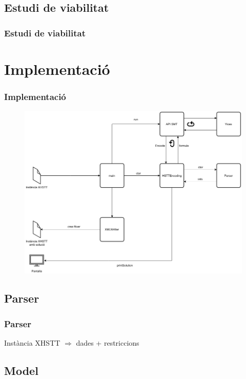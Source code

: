 \documentclass[8pt]{beamer}
\begin{document}
  \subsection{Estudi de viabilitat}

  \begin{frame}
    \frametitle{Estudi de viabilitat}

  \end{frame}

  \section{Implementació}
  
  \begin{frame}
  \frametitle{Implementació}
    \begin{figure}[p]
      \includegraphics[width=\textwidth]{Diagrames/Arqui2.png}
      \label{fig:procs}
    \end{figure}
  \end{frame}

  
  \subsection{Parser}
  
  \begin{frame}
    \frametitle{Parser}

    Instància XHSTT $\Rightarrow$ dades + restriccions


  \end{frame}

  \subsection{Model}
  
\end{document}
